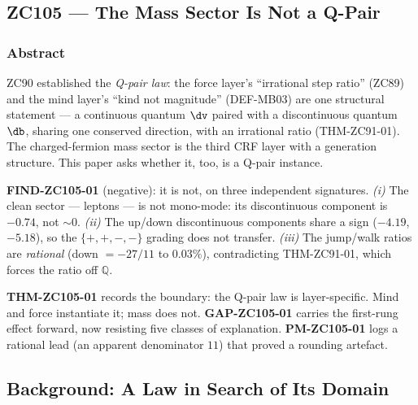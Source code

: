 \documentclass[12pt, a4paper]{article}
\begin{document}
\subsection{ZC105 --- The Mass Sector Is Not a Q-Pair}
\subsubsection*{Abstract}
\sloppy
ZC90 established the \emph{Q-pair law}: the force layer's ``irrational step
ratio'' (ZC89) and the mind layer's ``kind not magnitude'' (DEF-MB03) are one
structural statement --- a continuous quantum $\dv$ paired with a discontinuous
quantum $\db$, sharing one conserved direction, with an irrational ratio
(THM-ZC91-01). The charged-fermion mass sector is the third CRF layer with a
generation structure. This paper asks whether it, too, is a Q-pair instance.

\textbf{FIND-ZC105-01} (negative): it is not, on three independent signatures.
\emph{(i)} The clean sector --- leptons --- is not mono-mode: its
discontinuous component is $-0.74$, not $\sim0$. \emph{(ii)} The up/down
discontinuous components share a sign ($-4.19$, $-5.18$), so the $\{+,+,-,-\}$
grading does not transfer. \emph{(iii)} The jump/walk ratios are \emph{rational}
(down $=-27/11$ to $0.03\%$), contradicting THM-ZC91-01, which forces the ratio
off $\mathbb{Q}$.

\textbf{THM-ZC105-01} records the boundary: the Q-pair law is layer-specific.
Mind and force instantiate it; mass does not. \textbf{GAP-ZC105-01} carries the
first-rung effect forward, now resisting five classes of explanation.
\textbf{PM-ZC105-01} logs a rational lead (an apparent denominator $11$) that
proved a rounding artefact.


\subsection{Background: A Law in Search of Its Domain}
\label{sec:background-zc105}
\end{document}
